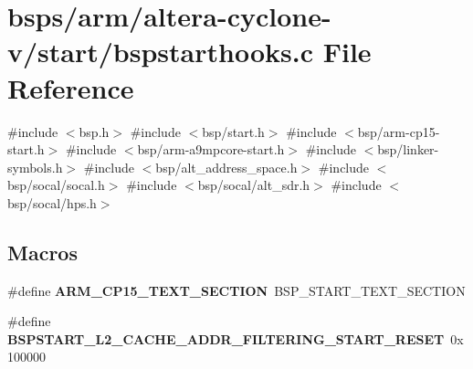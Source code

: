 \hypertarget{altera-cyclone-v_2start_2bspstarthooks_8c}{}\section{bsps/arm/altera-\/cyclone-\/v/start/bspstarthooks.c File Reference}
\label{altera-cyclone-v_2start_2bspstarthooks_8c}
{\ttfamily \#include $<$bsp.\+h$>$}\newline
{\ttfamily \#include $<$bsp/start.\+h$>$}\newline
{\ttfamily \#include $<$bsp/arm-\/cp15-\/start.\+h$>$}\newline
{\ttfamily \#include $<$bsp/arm-\/a9mpcore-\/start.\+h$>$}\newline
{\ttfamily \#include $<$bsp/linker-\/symbols.\+h$>$}\newline
{\ttfamily \#include $<$bsp/alt\+\_\+address\+\_\+space.\+h$>$}\newline
{\ttfamily \#include $<$bsp/socal/socal.\+h$>$}\newline
{\ttfamily \#include $<$bsp/socal/alt\+\_\+sdr.\+h$>$}\newline
{\ttfamily \#include $<$bsp/socal/hps.\+h$>$}\newline
\subsection*{Macros}
\begin{DoxyCompactItemize}
\item 
\mbox{\label{altera-cyclone-v_2start_2bspstarthooks_8c_a0c4c710cc0f6b1bfbdc26505bc53a447}} 
\#define {\bfseries A\+R\+M\+\_\+\+C\+P15\+\_\+\+T\+E\+X\+T\+\_\+\+S\+E\+C\+T\+I\+ON}~B\+S\+P\+\_\+\+S\+T\+A\+R\+T\+\_\+\+T\+E\+X\+T\+\_\+\+S\+E\+C\+T\+I\+ON
\item 
\mbox{\label{altera-cyclone-v_2start_2bspstarthooks_8c_af407c353168bc7d8332994842de56f33}} 
\#define {\bfseries B\+S\+P\+S\+T\+A\+R\+T\+\_\+\+L2\+\_\+\+C\+A\+C\+H\+E\+\_\+\+A\+D\+D\+R\+\_\+\+F\+I\+L\+T\+E\+R\+I\+N\+G\+\_\+\+S\+T\+A\+R\+T\+\_\+\+R\+E\+S\+ET}~0x100000
\end{DoxyCompactItemize}
